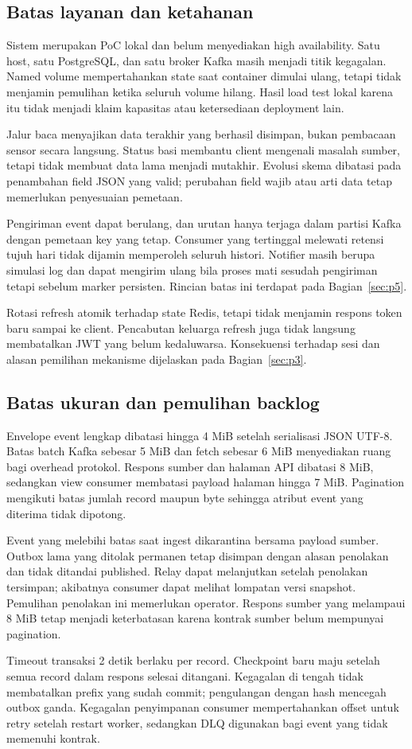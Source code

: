 \subsection{Batas layanan dan ketahanan}
Sistem merupakan PoC lokal dan belum menyediakan high availability. Satu host, satu PostgreSQL, dan satu broker Kafka masih menjadi titik kegagalan. Named volume mempertahankan state saat container dimulai ulang, tetapi tidak menjamin pemulihan ketika seluruh volume hilang. Hasil load test lokal karena itu tidak menjadi klaim kapasitas atau ketersediaan deployment lain.

Jalur baca menyajikan data terakhir yang berhasil disimpan, bukan pembacaan sensor secara langsung. Status basi membantu client mengenali masalah sumber, tetapi tidak membuat data lama menjadi mutakhir. Evolusi skema dibatasi pada penambahan field JSON yang valid; perubahan field wajib atau arti data tetap memerlukan penyesuaian pemetaan.

Pengiriman event dapat berulang, dan urutan hanya terjaga dalam partisi Kafka dengan pemetaan key yang tetap. Consumer yang tertinggal melewati retensi tujuh hari tidak dijamin memperoleh seluruh histori. Notifier masih berupa simulasi log dan dapat mengirim ulang bila proses mati sesudah pengiriman tetapi sebelum marker persisten. Rincian batas ini terdapat pada Bagian~\ref{sec:p5}.

Rotasi refresh atomik terhadap state Redis, tetapi tidak menjamin respons token baru sampai ke client. Pencabutan keluarga refresh juga tidak langsung membatalkan JWT yang belum kedaluwarsa. Konsekuensi terhadap sesi dan alasan pemilihan mekanisme dijelaskan pada Bagian~\ref{sec:p3}.

\subsection{Batas ukuran dan pemulihan backlog}
Envelope event lengkap dibatasi hingga 4 MiB setelah serialisasi JSON UTF-8. Batas batch Kafka sebesar 5 MiB dan fetch sebesar 6 MiB menyediakan ruang bagi overhead protokol. Respons sumber dan halaman API dibatasi 8 MiB, sedangkan view consumer membatasi payload halaman hingga 7 MiB. Pagination mengikuti batas jumlah record maupun byte sehingga atribut event yang diterima tidak dipotong.

Event yang melebihi batas saat ingest dikarantina bersama payload sumber. Outbox lama yang ditolak permanen tetap disimpan dengan alasan penolakan dan tidak ditandai published. Relay dapat melanjutkan setelah penolakan tersimpan; akibatnya consumer dapat melihat lompatan versi snapshot. Pemulihan penolakan ini memerlukan operator. Respons sumber yang melampaui 8 MiB tetap menjadi keterbatasan karena kontrak sumber belum mempunyai pagination.

Timeout transaksi 2 detik berlaku per record. Checkpoint baru maju setelah semua record dalam respons selesai ditangani. Kegagalan di tengah tidak membatalkan prefix yang sudah commit; pengulangan dengan hash mencegah outbox ganda. Kegagalan penyimpanan consumer mempertahankan offset untuk retry setelah restart worker, sedangkan DLQ digunakan bagi event yang tidak memenuhi kontrak.
